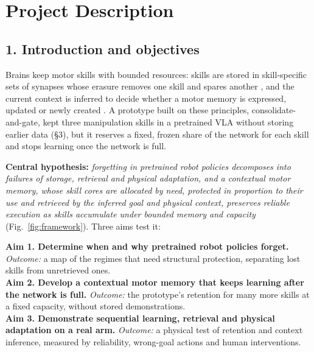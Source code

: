 \documentclass[11pt]{article}
\begin{document}
\section*{Project Description}

\subsection*{1. Introduction and objectives}
Brains keep motor skills with bounded resources: skills are stored in skill-specific sets of synapses whose erasure
removes one skill and spares another \citep{hayashitakagi2015}, and the current context is inferred to decide whether a
motor memory is expressed, updated or newly created \citep{heald2021}. A prototype built on these principles,
consolidate-and-gate, kept three manipulation skills in a pretrained VLA without storing earlier data (\S3), but it
reserves a fixed, frozen share of the network for each skill and stops learning once the network is full.

\textbf{Central hypothesis:} \emph{forgetting in pretrained robot policies decomposes into failures of storage,
retrieval and physical adaptation, and a contextual motor memory, whose skill cores are allocated by need, protected in
proportion to their use and retrieved by the inferred goal and physical context, preserves reliable execution as skills
accumulate under bounded memory and capacity} (Fig.~\ref{fig:framework}). Three aims test it:

\textbf{Aim 1. Determine when and why pretrained robot policies forget.} \emph{Outcome:} a map of the regimes that need
structural protection, separating lost skills from unretrieved ones.\\
\textbf{Aim 2. Develop a contextual motor memory that keeps learning after the network is full.} \emph{Outcome:} the
prototype's retention for many more skills at a fixed capacity, without stored demonstrations.\\
\textbf{Aim 3. Demonstrate sequential learning, retrieval and physical adaptation on a real arm.} \emph{Outcome:} a
physical test of retention and context inference, measured by reliability, wrong-goal actions and human interventions.
\end{document}
